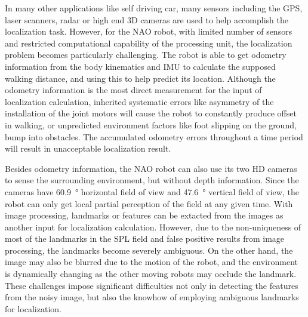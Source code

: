 
In many other applications like self driving car, many sensors including the \gls{GPS}, laser scanners, radar or high end 3D cameras are used to help accomplish the localization task. 
However, for the NAO robot, with limited number of sensors and restricted computational capability of the processing unit, the localization problem becomes particularly challenging. The robot is able to get odometry information from the body kinematics and \gls{IMU} to calculate the supposed walking distance, and using this to help predict its location. 
Although the odometry information is the most direct measurement for the input of localization calculation, inherited systematic errors like asymmetry of the installation of the joint motors will cause the robot to constantly produce offset in walking, or unpredicted environment factors like foot slipping on the ground, bump into obstacles. 
The accumulated odometry errors throughout a time period will result in unacceptable localization result. 

Besides odometry information, the NAO robot can also use its two \gls{HD} cameras to sense the surrounding environment, but without depth information. Since the cameras have \SI{60.9}{\degree} horizontal field of view and \SI{47.6}{\degree} vertical field of view, the robot can only get local partial perception of the field at any given time.
With image processing, landmarks or features can be extacted from the images as another input for localization calculation. However, due to the non-uniqueness of most of the landmarks in the \gls{SPL} field and false positive results from image processing, the landmarks become severely ambiguous. On the other hand, the image may also be blurred due to the motion of the robot, and the environment is dynamically changing as the other moving robots may occlude the landmark. These challenges impose significant difficulties not only in detecting the features from the noisy image, but also the knowhow of employing ambiguous landmarks for localization. 


